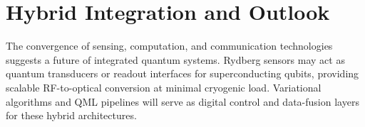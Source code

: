 \section{Hybrid Integration and Outlook}
The convergence of sensing, computation, and communication technologies suggests a future of integrated quantum systems. Rydberg sensors may act as quantum transducers or readout interfaces for superconducting qubits, providing scalable RF-to-optical conversion at minimal cryogenic load. Variational algorithms and QML pipelines will serve as digital control and data-fusion layers for these hybrid architectures.

